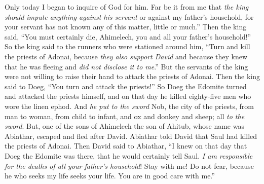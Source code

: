 \begin{biblechapter}
\verse Only today I began to inquire of God for him. Far be it from me that \textit{the king should impute anything against his servant} or against my father’s household, for your servant has not known any of this matter, little or much.”
\verse Then the king said, “You must certainly die, Ahimelech, you and all your father’s household!”
\verse So the king said to the runners who were stationed around him, “Turn and kill the priests of Adonai, because \textit{they also support David} and because they knew that he was fleeing and \textit{did not disclose it to me}.” But the servants of the king were not willing to raise their hand to attack the priests of Adonai.
\verse Then the king said to Doeg, “You turn and attack the priests!” So Doeg the Edomite turned and attacked the priests himself, and on that day he killed eighty-five men who wore the linen ephod.
\verse And \textit{he put to the sword} Nob, the city of the priests, from man to woman, from child to infant, and ox and donkey and sheep; all \textit{to the sword}.
\verse But, one of the sons of Ahimelech the son of Ahitub, whose name was Abiathar, escaped and fled after David.
\verse Abiathar told David that Saul had killed the priests of Adonai.
\verse Then David said to Abiathar, “I knew on that day that Doeg the Edomite was there, that he would certainly tell Saul. \textit{I am responsible for the deaths of all your father’s household}!
\verse Stay with me! Do not fear, because he who seeks my life seeks your life. You are in good care with me.”
\end{biblechapter}

